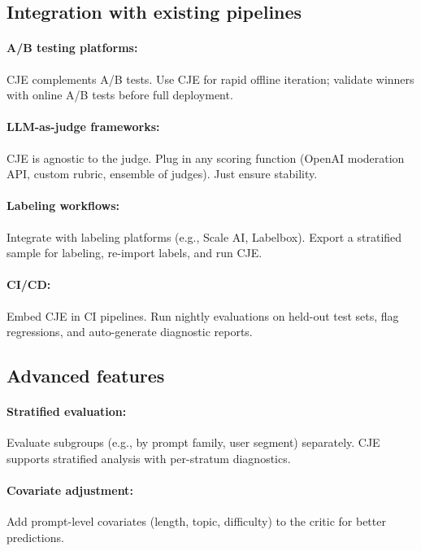 \subsection{Integration with existing pipelines}

\paragraph{A/B testing platforms:} CJE complements A/B tests. Use CJE for rapid offline iteration; validate winners with online A/B tests before full deployment.

\paragraph{LLM-as-judge frameworks:} CJE is agnostic to the judge. Plug in any scoring function (OpenAI moderation API, custom rubric, ensemble of judges). Just ensure stability.

\paragraph{Labeling workflows:} Integrate with labeling platforms (e.g., Scale AI, Labelbox). Export a stratified sample for labeling, re-import labels, and run CJE.

\paragraph{CI/CD:} Embed CJE in CI pipelines. Run nightly evaluations on held-out test sets, flag regressions, and auto-generate diagnostic reports.

\subsection{Advanced features}

\paragraph{Stratified evaluation:} Evaluate subgroups (e.g., by prompt family, user segment) separately. CJE supports stratified analysis with per-stratum diagnostics.

\paragraph{Covariate adjustment:} Add prompt-level covariates (length, topic, difficulty) to the critic for better predictions.

